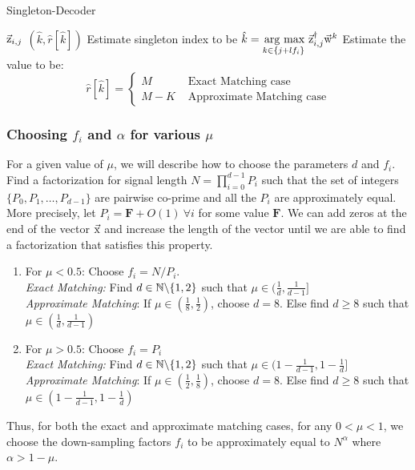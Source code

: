 \begin{algorithm}[h!]
\caption{Singleton-Decoder}
\label{Algo:SingletonDecoder}
\begin{algorithmic}
 $\vec{\mathrm{z}}_{i,j}$
\vspace{\gap}
 $(\hat{k},\hat{r}[\hat{k}])$
\vspace{\gap}
\State Estimate singleton index to be $ \hat{k} = \underset{k\in\{j+l f_i\}}{\operatorname*{\,arg\ max}}\  \vec{\mathrm{z}}^{\dagger}_{i,j} \vec{\mathrm{w}}^{k}$
\vspace{\gap}
  \State Estimate the value to be:$$ \hat{r}[\hat{k}]=
   \begin{cases}
   M & \text{ Exact Matching case}\\
  M-K & \text{ Approximate Matching case}
  \end{cases}
  $$
\end{algorithmic}
\end{algorithm}

\subsubsection{Choosing $f_i$ and $\alpha$ for various $\mu$}
\label{subsec:DesignParameters}

For a given value of $\mu$, we will describe how to choose the parameters $d$ and $f_i$. Find a factorization for signal length $N=\prod_{i=0}^{d-1} P_i$ such that the set of integers $\{P_0,P_1,\ldots,P_{d-1}\}$ are pairwise co-prime and all the $P_i$ are approximately equal. More precisely, let $P_i=\mathbf{F}+O(1) ~\forall i$ for some value $\mathbf{F}$. We can add zeros at the end of the vector $\vec{\mathrm{x}}$ and increase the length of the vector until we are able to find a factorization that satisfies this property.
\begin{enumerate}
	\item For $\mu<0.5$: Choose $f_i = N/P_i$. \\
	{\it Exact Matching:} Find $d\in \mathbb{N}\backslash \{1,2\}$ such that $\mu\in(\frac{1}{d},\frac{1}{d-1}]$\\
	{\it Approximate Matching}: If $\mu\in(\frac{1}{8},\frac{1}{2})$, choose $d=8$. Else find $d\geq 8$ such that $\mu\in(\frac{1}{d},\frac{1}{d-1})$
	\item For $\mu>0.5$: Choose $f_i = P_i$\\
	 {\it Exact Matching:} Find $d\in \mathbb{N}\backslash \{1,2\}$ such that $\mu\in(1-\frac{1}{d-1},1-\frac{1}{d}]$\\
	 {\it Approximate Matching}: If $\mu\in(\frac{1}{2},\frac{1}{8})$, choose $d=8$. Else find $d\geq 8$ such that $\mu\in(1-\frac{1}{d-1},1-\frac{1}{d})$\\ 
\end{enumerate}
Thus, for both the exact and approximate matching cases, for any $0<\mu<1$, we choose the down-sampling factors $f_i$ to be approximately equal to $N^{\alpha}$ where $\alpha > 1- \mu$.


